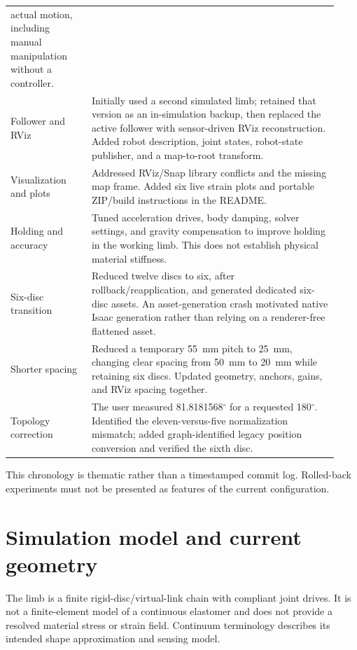\documentclass[11pt,letterpaper]{article}
\newcommand{\degrees}{\ensuremath{^{\circ}}}
\begin{document}
\begin{longtable}{p{0.23\linewidth}p{0.70\linewidth}}
actual motion, including manual manipulation without a controller.\\
Follower and RViz & Initially used a second simulated limb; retained that
version as an in-simulation backup, then replaced the active follower with
sensor-driven RViz reconstruction. Added robot description, joint states,
robot-state publisher, and a map-to-root transform.\\
Visualization and plots & Addressed RViz/Snap library conflicts and the
missing map frame. Added six live strain plots and portable ZIP/build
instructions in the README.\\
Holding and accuracy & Tuned acceleration drives, body damping, solver
settings, and gravity compensation to improve holding in the working limb.
This does not establish physical material stiffness.\\
Six-disc transition & Reduced twelve discs to six, after rollback/reapplication,
and generated dedicated six-disc assets. An asset-generation crash motivated
native Isaac generation rather than relying on a renderer-free flattened asset.\\
Shorter spacing & Reduced a temporary 55~mm pitch to 25~mm, changing clear
spacing from 50~mm to 20~mm while retaining six discs. Updated geometry,
anchors, gains, and RViz spacing together.\\
Topology correction & The user measured 81.8181568\degrees{} for a requested
180\degrees{}. Identified the eleven-versus-five normalization mismatch;
added graph-identified legacy position conversion and verified the sixth disc.\\
\bottomrule
\end{longtable}

This chronology is thematic rather than a timestamped commit log. Rolled-back
experiments must not be presented as features of the current configuration.

\section{Simulation model and current geometry}
The limb is a finite rigid-disc/virtual-link chain with compliant joint drives.
It is not a finite-element model of a continuous elastomer and does not provide
a resolved material stress or strain field. Continuum terminology describes
its intended shape approximation and sensing model.
\end{document}
